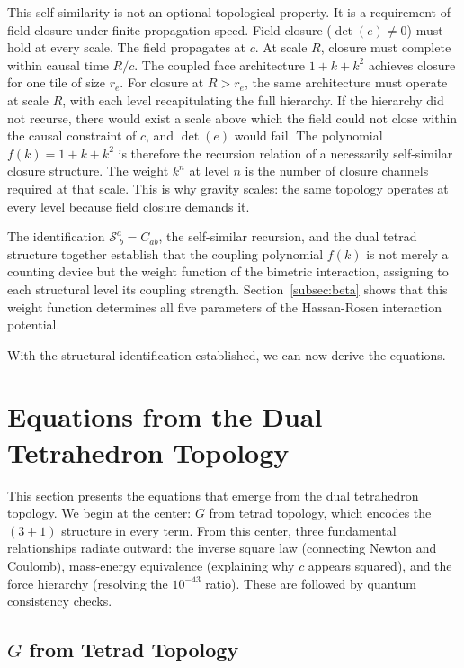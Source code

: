 \documentclass[aps,prd,preprint,superscriptaddress,showpacs,preprintnumbers,amsmath,amssymb,nofootinbib]{revtex4-2}
\begin{document}
This self-similarity is not an optional topological property. It is a requirement of field closure under finite propagation speed. Field closure ($\det(e) \neq 0$) must hold at every scale. The field propagates at $c$. At scale $R$, closure must complete within causal time $R/c$. The coupled face architecture $1 + k + k^2$ achieves closure for one tile of size $r_e$. For closure at $R > r_e$, the same architecture must operate at scale $R$, with each level recapitulating the full hierarchy. If the hierarchy did not recurse, there would exist a scale above which the field could not close within the causal constraint of $c$, and $\det(e)$ would fail. The polynomial $f(k) = 1 + k + k^2$ is therefore the recursion relation of a necessarily self-similar closure structure. The weight $k^n$ at level $n$ is the number of closure channels required at that scale. This is why gravity scales: the same topology operates at every level because field closure demands it.

The identification $\mathcal{S}^a_{\;b} = C_{ab}$, the self-similar recursion, and the dual tetrad structure together establish that the coupling polynomial $f(k)$ is not merely a counting device but the weight function of the bimetric interaction, assigning to each structural level its coupling strength. Section~\ref{subsec:beta} shows that this weight function determines all five parameters of the Hassan-Rosen interaction potential.

With the structural identification established, we can now derive the equations.

\section{Equations from the Dual Tetrahedron Topology}
\label{sec:five}

This section presents the equations that emerge from the dual tetrahedron topology. We begin at the center: $G$ from tetrad topology, which encodes the $(3{+}1)$ structure in every term. From this center, three fundamental relationships radiate outward: the inverse square law (connecting Newton and Coulomb), mass-energy equivalence (explaining why $c$ appears squared), and the force hierarchy (resolving the $10^{-43}$ ratio). These are followed by quantum consistency checks.

\subsection{$G$ from Tetrad Topology}
\label{subsec:master-eq}
\end{document}
